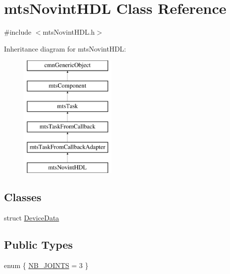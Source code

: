 \hypertarget{classmts_novint_h_d_l}{\section{mts\-Novint\-H\-D\-L Class Reference}
\label{classmts_novint_h_d_l}
}


{\ttfamily \#include $<$mts\-Novint\-H\-D\-L.\-h$>$}

Inheritance diagram for mts\-Novint\-H\-D\-L\-:\begin{figure}[H]
\begin{center}
\leavevmode
\includegraphics[height=6.000000cm]{d4/d52/classmts_novint_h_d_l}
\end{center}
\end{figure}
\subsection*{Classes}
\begin{DoxyCompactItemize}
\item 
struct \hyperlink{structmts_novint_h_d_l_1_1_device_data}{Device\-Data}
\end{DoxyCompactItemize}
\subsection*{Public Types}
\begin{DoxyCompactItemize}
\item 
enum \{ \hyperlink{classmts_novint_h_d_l_a80a42ff57a10a87dcd6874c663cdcf65ac8cb22af32b40caa61bd313eafc3d9f0}{N\-B\-\_\-\-J\-O\-I\-N\-T\-S} = 3
 \}
\end{DoxyCompactItemize}
